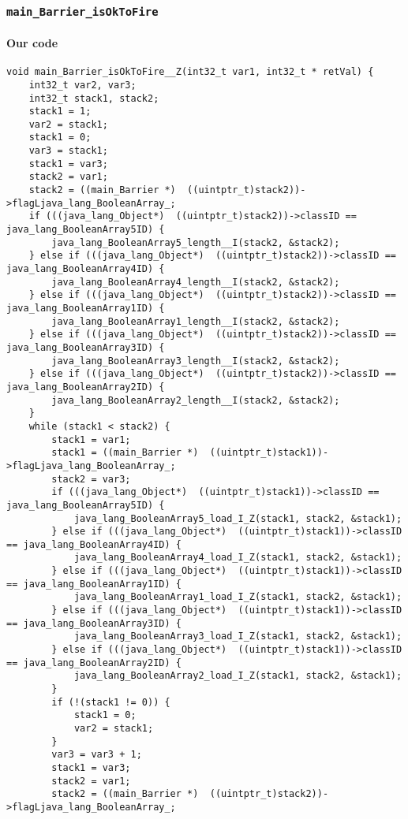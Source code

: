 \subsubsection{\texttt{main\_Barrier\_isOkToFire}}

\paragraph{Our code}\hfill
\begin{lstlisting}[firstnumber=472]
void main_Barrier_isOkToFire__Z(int32_t var1, int32_t * retVal) {
	int32_t var2, var3;
	int32_t stack1, stack2;
	stack1 = 1;
	var2 = stack1;
	stack1 = 0;
	var3 = stack1;
	stack1 = var3;
	stack2 = var1;
	stack2 = ((main_Barrier *)  ((uintptr_t)stack2))->flagLjava_lang_BooleanArray_;
	if (((java_lang_Object*)  ((uintptr_t)stack2))->classID == java_lang_BooleanArray5ID) {
		java_lang_BooleanArray5_length__I(stack2, &stack2);
	} else if (((java_lang_Object*)  ((uintptr_t)stack2))->classID == java_lang_BooleanArray4ID) {
		java_lang_BooleanArray4_length__I(stack2, &stack2);
	} else if (((java_lang_Object*)  ((uintptr_t)stack2))->classID == java_lang_BooleanArray1ID) {
		java_lang_BooleanArray1_length__I(stack2, &stack2);
	} else if (((java_lang_Object*)  ((uintptr_t)stack2))->classID == java_lang_BooleanArray3ID) {
		java_lang_BooleanArray3_length__I(stack2, &stack2);
	} else if (((java_lang_Object*)  ((uintptr_t)stack2))->classID == java_lang_BooleanArray2ID) {
		java_lang_BooleanArray2_length__I(stack2, &stack2);
	}
	while (stack1 < stack2) {
		stack1 = var1;
		stack1 = ((main_Barrier *)  ((uintptr_t)stack1))->flagLjava_lang_BooleanArray_;
		stack2 = var3;
		if (((java_lang_Object*)  ((uintptr_t)stack1))->classID == java_lang_BooleanArray5ID) {
			java_lang_BooleanArray5_load_I_Z(stack1, stack2, &stack1);
		} else if (((java_lang_Object*)  ((uintptr_t)stack1))->classID == java_lang_BooleanArray4ID) {
			java_lang_BooleanArray4_load_I_Z(stack1, stack2, &stack1);
		} else if (((java_lang_Object*)  ((uintptr_t)stack1))->classID == java_lang_BooleanArray1ID) {
			java_lang_BooleanArray1_load_I_Z(stack1, stack2, &stack1);
		} else if (((java_lang_Object*)  ((uintptr_t)stack1))->classID == java_lang_BooleanArray3ID) {
			java_lang_BooleanArray3_load_I_Z(stack1, stack2, &stack1);
		} else if (((java_lang_Object*)  ((uintptr_t)stack1))->classID == java_lang_BooleanArray2ID) {
			java_lang_BooleanArray2_load_I_Z(stack1, stack2, &stack1);
		}
		if (!(stack1 != 0)) {
			stack1 = 0;
			var2 = stack1;
		}
		var3 = var3 + 1;
		stack1 = var3;
		stack2 = var1;
		stack2 = ((main_Barrier *)  ((uintptr_t)stack2))->flagLjava_lang_BooleanArray_;

\end{lstlisting}
